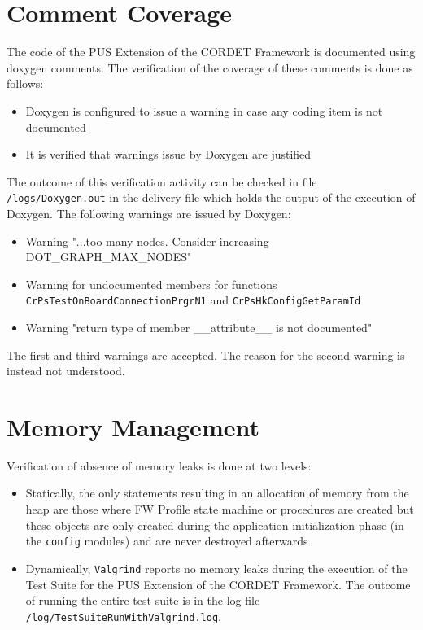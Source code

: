 \documentclass{pnp_article}
\begin{document}
\section{Comment Coverage}\label{sec:svrCommCov}
The code of the PUS Extension of the CORDET Framework is documented using doxygen comments. The verification of the coverage of these comments is done as follows:

\begin{itemize}
\item Doxygen is configured to issue a warning in case any coding item is not documented
\item It is verified that warnings issue by Doxygen are justified
\end{itemize}

The outcome of this verification activity can be checked in file \texttt{/logs/Doxygen.out} in the delivery file which holds the output of the execution of Doxygen. The following warnings are issued by Doxygen:

\begin{itemize}
\item Warning "...too many nodes. Consider increasing DOT_GRAPH_MAX_NODES"
\item Warning for undocumented members for functions \texttt{CrPsTestOnBoardConnectionPrgrN1} and \texttt{CrPsHkConfigGetParamId}
\item Warning "return type of member __attribute__ is not documented"
\end{itemize}

The first and third warnings are accepted. The reason for the second warning is instead not understood.


\section{Memory Management}\label{sec:svrMemMng}
Verification of absence of memory leaks is done at two levels:

\begin{itemize}
\item Statically, the only statements resulting in an allocation of memory from the heap are those where FW Profile state machine or procedures are created but these objects are only created during the application initialization phase (in the \texttt{config} modules) and are never destroyed afterwards
\item Dynamically, \texttt{Valgrind} reports no memory leaks during the execution of the Test Suite for the PUS Extension of the CORDET Framework. The outcome of running the entire test suite is in the log file \texttt{/log/TestSuiteRunWithValgrind.log}.
\end{itemize}
\end{document}
